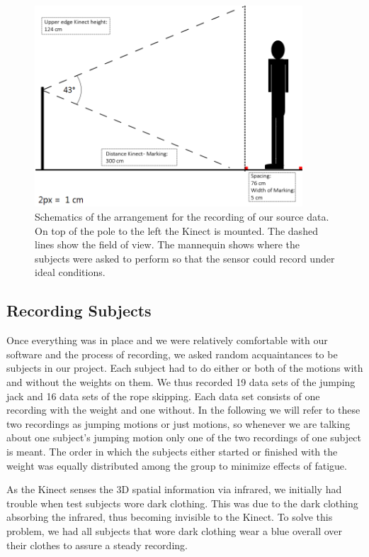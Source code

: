 \documentclass[a4paper]{article}
\begin{document}
\begin{figure}
	\centering
	\includegraphics[width=10cm]{Aufbauohnelizenz.png}
	\caption{Schematics of the arrangement for the recording of our source data. On top of the pole to the left the Kinect is mounted. The dashed lines show the field of view. The mannequin shows where the subjects were asked to perform so that the sensor could record under ideal conditions.}
	\label{fig:schematic}
\end{figure}

\subsection{Recording Subjects}

Once everything was in place and we were relatively comfortable with our software and the process of recording, we asked random acquaintances to be subjects in our project.
Each subject had to do either or both of the motions with and without the weights on them.
We thus recorded 19 data sets of the jumping jack and 16 data sets of the rope skipping.
Each data set consists of one recording with the weight and one without.
In the following we will refer to these two recordings as jumping motions or just motions, so whenever we are talking about one subject's jumping motion only one of the two recordings of one subject is meant.
The order in which the subjects either started or finished with the weight was equally distributed among the group to minimize effects of fatigue.

As the Kinect senses the 3D spatial information via infrared, we initially had trouble when test subjects wore dark clothing.
This was due to the dark clothing absorbing the infrared, thus becoming invisible to the Kinect.
To solve this problem, we had all subjects that wore dark clothing wear a blue overall over their clothes to assure a steady recording.
\end{document}
